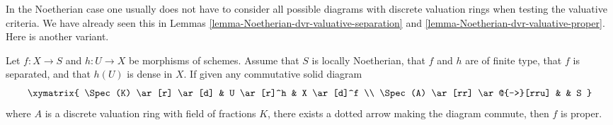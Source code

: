 \noindent
In the Noetherian case one usually does not have to consider all
possible diagrams with discrete valuation rings when testing the
valuative criteria. We have already seen this
in Lemmas \ref{lemma-Noetherian-dvr-valuative-separation} and
\ref{lemma-Noetherian-dvr-valuative-proper}. Here is another variant.

\begin{lemma}
\label{lemma-refined-valuative-criterion-proper}
Let $f : X \to S$ and $h : U \to X$ be morphisms of schemes.
Assume that $S$ is locally Noetherian, that $f$ and $h$ are of finite type,
that $f$ is separated, and that $h(U)$ is dense in $X$.
If given any commutative solid diagram
$$
\xymatrix{
\Spec(K) \ar[r] \ar[d] & U \ar[r]^h & X \ar[d]^f \\
\Spec(A) \ar[rr] \ar@{-->}[rru] & & S
}
$$
where $A$ is a discrete valuation ring with field of fractions $K$, there
exists a dotted arrow making the diagram commute, then $f$ is proper.
\end{lemma}

